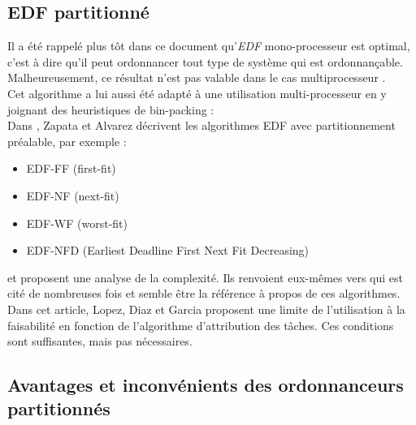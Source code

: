 \documentclass[11pt,a4paper,oneside]{report}
\begin{document}
\subsection{EDF partitionné}
Il a été rappelé plus tôt dans ce document qu'\textit{EDF} mono-processeur est optimal, 
c'est à dire qu'il peut ordonnancer tout type de système qui est ordonnançable. 
Malheureusement, ce résultat n'est pas valable dans le cas multiprocesseur \cite{dertouzos_multiprocessor_1989}.\\

Cet algorithme a lui aussi été adapté à une utilisation multi-processeur en y joignant 
des heuristiques de bin-packing : \\
Dans \cite{pereira_zapata_edf_2005}, Zapata et Alvarez décrivent les algorithmes 
EDF avec partitionnement préalable, par exemple : \\
\begin{itemize}
	\item EDF-FF (first-fit)
	\item EDF-NF (next-fit)
	\item EDF-WF (worst-fit)
	\item EDF-NFD (Earliest Deadline First Next Fit Decreasing)
\end{itemize}
et proposent une analyse de la complexité. Ils renvoient eux-mêmes vers 
\cite{lopez_utilization_2004} 
qui est cité de nombreuses fois et semble être la référence à propos de ces algorithmes. 
Dans cet article, Lopez, Diaz et Garcia proposent une limite de l'utilisation à la 
faisabilité en fonction de l'algorithme d'attribution des tâches. Ces conditions 
sont suffisantes, mais pas nécessaires.\\ %



\subsection{Avantages et inconvénients des ordonnanceurs partitionnés}
\end{document}
